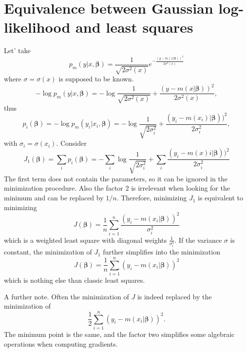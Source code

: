 \documentclass{article}
\begin{document}
\section{Equivalence between Gaussian log-likelihood and least squares}
\label{sec:logequivalence}
Let' take 
\[
p_m(y|x,\boldsymbol{\beta})=\frac{1}{\sqrt{2\sigma^2(x)}}e^{-\frac{(y-m(x|\boldsymbol{\beta}))^2}{2\sigma^2(x)}}
\]
where $\sigma=\sigma(x)$ is supposed to be known.
\[
-\log p_m(y|x,\boldsymbol{\beta})=-\log{\frac{1}{\sqrt{2\sigma^2(x)}}}+\frac{(y-m(x|\boldsymbol{\beta}))^2}{2\sigma^2(x)},
\]
thus
\[
p_i(\boldsymbol{\beta})=-\log p_m(y_i|x_i,\boldsymbol{\beta})=-\log{\frac{1}{\sqrt{2\sigma^2_i}}}+\frac{(y_i-m(x_i)|\boldsymbol{\beta}))^2}{2\sigma^2_i},
\]
with $\sigma_i=\sigma(x_i)$. Consider 
\[
J_1(\boldsymbol{\beta})=\sum_i p_i(\boldsymbol{\beta})=-\sum_i \log{\frac{1}{\sqrt{2\sigma^2_i}}} +\sum_i \frac{(y_i-m(x)i|\boldsymbol{\beta}))^2}{2\sigma^2_i}
\]
The first term does not contain the parameters, so it can be ignored in the minimization procedure. Also the factor $2$ is irrelevant when looking for the minimum and can be replaced by $1/n$. Therefore, minimizing $J_1$ is equivalent to minimizing
\[
J(\boldsymbol{\beta})=\frac{1}{n}\sum_{i=1}^n \frac{(y_i-m(x_i|\boldsymbol{\beta}))^2}{\sigma^2_i}
\]
which is a weighted least square with diagonal weights $\frac{1}{\sigma_i^2}$. If the variance $\sigma$ is constant, the minimization of $J_1$ further simplifies into the minimization
\[
J(\boldsymbol{\beta})=\frac{1}{n}\sum_{i=1}^n (y_i-m(x_i|\boldsymbol{\beta}))^2
\]
which is nothing else than classic least squares.

A further note. Often the minimization of $J$ is indeed replaced by the minimization of 
\[
\frac{1}{2}\sum_{i=1}^n (y_i-m(x_i|\boldsymbol{\beta}))^2.
\]
The minimum point is the same, and the factor two simplifies some algebraic operations when computing gradients.
\end{document}

